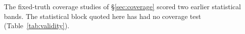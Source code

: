 The fixed-truth coverage studies of \S\ref{sec:coverage} scored two earlier statistical bands. The statistical block quoted here has had no coverage test (Table~\ref{tab:validity}).
